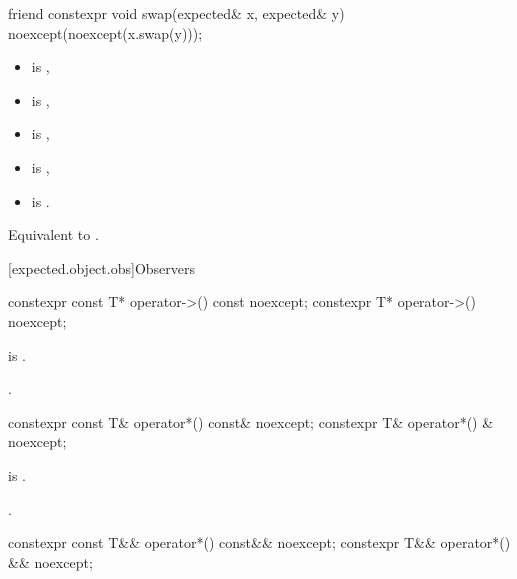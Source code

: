 %
\begin{itemdecl}
friend constexpr void swap(expected& x, expected& y) noexcept(noexcept(x.swap(y)));
\end{itemdecl}

\begin{itemdescr}
\pnum
\constraints
\begin{itemize}
\item {} is ,
\item {} is ,
\item {} is ,
\item {} is ,
\item {} is .
\end{itemize}

\pnum
\effects
Equivalent to .
\end{itemdescr}

[expected.object.obs]{Observers}

%
\begin{itemdecl}
constexpr const T* operator->() const noexcept;
constexpr T* operator->() noexcept;
\end{itemdecl}

\begin{itemdescr}
\pnum
\hardexpects
{} is .

\pnum
\returns
{}.
\end{itemdescr}

%
\begin{itemdecl}
constexpr const T& operator*() const& noexcept;
constexpr T& operator*() & noexcept;
\end{itemdecl}

\begin{itemdescr}
\pnum
\hardexpects
{} is .

\pnum
\returns
{}.
\end{itemdescr}

%
\begin{itemdecl}
constexpr const T&& operator*() const&& noexcept;
constexpr T&& operator*() && noexcept;
\end{itemdecl}


